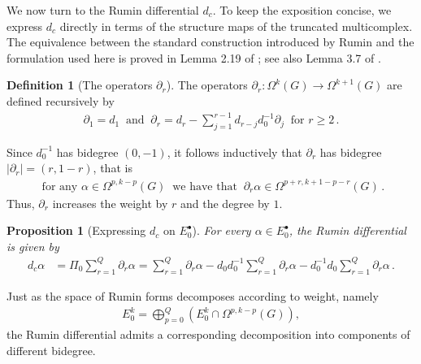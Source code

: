 \documentclass[dvipsnames]{amsart}
\newtheorem{proposition}[theorem]{Proposition}
\theoremstyle{definition}
\newtheorem{definition}[theorem]{Definition}
\theoremstyle{definition}
\numberwithin{equation}{section}
\begin{document}
We now turn to the Rumin differential $d_c$. To keep the exposition concise, we express $d_c$ directly in terms of the structure maps of the truncated multicomplex. The equivalence between the standard construction introduced by Rumin \cite{rumin_grenoble} and the formulation used here is proved in Lemma 2.19 of \cite{tripaldi2026spectralcomplexestruncatedmulticomplexes}; see also Lemma 3.7 of \cite{magnani2026stokestheorempositivelygraded}.

\begin{definition}[The operators $\partial_r$]\label{def: operators curly}
The operators $\partial_r\colon\Omega^k(G)\to\Omega^{k+1}(G)$ are defined recursively by
  \begin{align}\label{eq: operators curly}
        \partial_1=d_1\ \text{ and }\ \partial_r=d_r-\sum_{j=1}^{r-1}d_{r-j}d_0^{-1}\partial_j\ \text{ for }r\ge 2\,.
    \end{align}
\end{definition}

Since $d_0^{-1}$ has bidegree $(0,-1)$, it follows inductively that $\partial_r$ has bidegree  $\lvert\partial_r\rvert=(r,1-r)$, that is\begin{align}\label{eq: bidegree partial r}
        \text{ for any }\alpha\in\Omega^{p,k-p}(G)\ \text{ we have that }\ \partial_r\alpha\in\Omega^{p+r,k+1-p-r}(G)\,.
    \end{align}
Thus, $\partial_r$ increases the weight by $r$ and the degree by $1$.

\begin{proposition}[Expressing $d_c$ on $E_0^\bullet$]\label{prop: d_c on forms}
For every $\alpha\in E_0^\bullet$, the Rumin differential is given by
\begin{align}\label{eq: formulation of d_c}
d_c\alpha
&=
\Pi_0\sum_{r=1}^{Q}\partial_r\alpha
=
\sum_{r=1}^{Q}\partial_r\alpha
-d_0d_0^{-1}\sum_{r=1}^{Q}\partial_r\alpha
-d_0^{-1}d_0\sum_{r=1}^{Q}\partial_r\alpha\,.
\end{align}
\end{proposition}


Just as the space of Rumin forms decomposes according to weight, namely
\begin{align*}
E_0^k
=
\bigoplus_{p=0}^{Q}
\left(E_0^k\cap\Omega^{p,k-p}(G)\right),
\end{align*}
the Rumin differential admits a corresponding decomposition into components of different bidegree.
\end{document}
